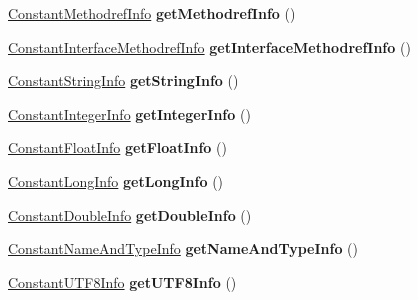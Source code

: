 \begin{DoxyCompactItemize}
\item 
\hyperlink{structConstantMethodrefInfo}{Constant\+Methodref\+Info} {\bfseries get\+Methodref\+Info} ()\hypertarget{classCPInfo_ae3903d798cb11da2eb29062926a7b3f3}{}\label{classCPInfo_ae3903d798cb11da2eb29062926a7b3f3}

\item 
\hyperlink{structConstantInterfaceMethodrefInfo}{Constant\+Interface\+Methodref\+Info} {\bfseries get\+Interface\+Methodref\+Info} ()\hypertarget{classCPInfo_a42a8c3a04e943cf3e861f05078561e87}{}\label{classCPInfo_a42a8c3a04e943cf3e861f05078561e87}

\item 
\hyperlink{structConstantStringInfo}{Constant\+String\+Info} {\bfseries get\+String\+Info} ()\hypertarget{classCPInfo_adb44f35169d1e959e5c53e6a76bfcbf5}{}\label{classCPInfo_adb44f35169d1e959e5c53e6a76bfcbf5}

\item 
\hyperlink{structConstantIntegerInfo}{Constant\+Integer\+Info} {\bfseries get\+Integer\+Info} ()\hypertarget{classCPInfo_ac4ceb48810a05b9e9b7fbd2839f9e1e4}{}\label{classCPInfo_ac4ceb48810a05b9e9b7fbd2839f9e1e4}

\item 
\hyperlink{structConstantFloatInfo}{Constant\+Float\+Info} {\bfseries get\+Float\+Info} ()\hypertarget{classCPInfo_ac293e1108e36e6296e3b85576689e6cb}{}\label{classCPInfo_ac293e1108e36e6296e3b85576689e6cb}

\item 
\hyperlink{structConstantLongInfo}{Constant\+Long\+Info} {\bfseries get\+Long\+Info} ()\hypertarget{classCPInfo_ad493f187e55c0f37c2705f159a7487d9}{}\label{classCPInfo_ad493f187e55c0f37c2705f159a7487d9}

\item 
\hyperlink{structConstantDoubleInfo}{Constant\+Double\+Info} {\bfseries get\+Double\+Info} ()\hypertarget{classCPInfo_a7192445d7605e9515e3b4a5883f3b0ef}{}\label{classCPInfo_a7192445d7605e9515e3b4a5883f3b0ef}

\item 
\hyperlink{structConstantNameAndTypeInfo}{Constant\+Name\+And\+Type\+Info} {\bfseries get\+Name\+And\+Type\+Info} ()\hypertarget{classCPInfo_ae9f2c4975801d3cfc6b98a115b26fe55}{}\label{classCPInfo_ae9f2c4975801d3cfc6b98a115b26fe55}

\item 
\hyperlink{structConstantUTF8Info}{Constant\+U\+T\+F8\+Info} {\bfseries get\+U\+T\+F8\+Info} ()\hypertarget{classCPInfo_a0f40798aeacc26f85a901fc7244687a1}{}\label{classCPInfo_a0f40798aeacc26f85a901fc7244687a1}


\end{DoxyCompactItemize}
